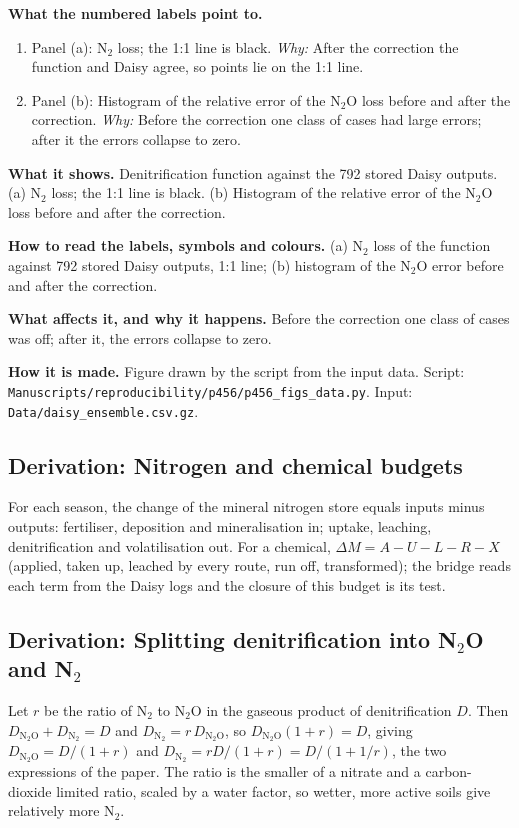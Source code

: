 \textbf{What the numbered labels point to.}
\begin{enumerate}[nosep,label=\protect\circled{\arabic*}]
\item Panel (a): N$_2$ loss; the 1:1 line is black. \emph{Why:} After the correction the function and Daisy agree, so points lie on the 1:1 line.
\item Panel (b): Histogram of the relative error of the N$_2$O loss before and after the correction. \emph{Why:} Before the correction one class of cases had large errors; after it the errors collapse to zero.
\end{enumerate}

\textbf{What it shows.} Denitrification function against the 792 stored Daisy outputs. (a) N$_2$ loss; the 1:1 line is black. (b) Histogram of the relative error of the N$_2$O loss before and after the correction.

\textbf{How to read the labels, symbols and colours.} (a) N$_2$ loss of the function against 792 stored Daisy outputs, 1:1 line; (b) histogram of the N$_2$O error before and after the correction.

\textbf{What affects it, and why it happens.} Before the correction one class of cases was off; after it, the errors collapse to zero.

\textbf{How it is made.} Figure drawn by the script from the input data. Script: \nolinkurl{Manuscripts/reproducibility/p456/p456_figs_data.py}. Input: \nolinkurl{Data/daisy_ensemble.csv.gz}.


\subsection{Derivation: Nitrogen and chemical budgets}\label{der:s3:5}
For each season, the change of the mineral nitrogen store equals inputs minus outputs: fertiliser, deposition and mineralisation in; uptake, leaching, denitrification and volatilisation out. For a chemical, $\Delta M=A-U-L-R-X$ (applied, taken up, leached by every route, run off, transformed); the bridge reads each term from the Daisy logs and the closure of this budget is its test.


\subsection{Derivation: Splitting denitrification into N$_2$O and N$_2$}\label{der:s3:6}
Let $r$ be the ratio of N$_2$ to N$_2$O in the gaseous product of denitrification $D$. Then $D_{\mathrm{N_2O}}+D_{\mathrm{N_2}}=D$ and $D_{\mathrm{N_2}}=r\,D_{\mathrm{N_2O}}$, so $D_{\mathrm{N_2O}}(1+r)=D$, giving $D_{\mathrm{N_2O}}=D/(1+r)$ and $D_{\mathrm{N_2}}=rD/(1+r)=D/(1+1/r)$, the two expressions of the paper. The ratio is the smaller of a nitrate and a carbon-dioxide limited ratio, scaled by a water factor, so wetter, more active soils give relatively more N$_2$.


